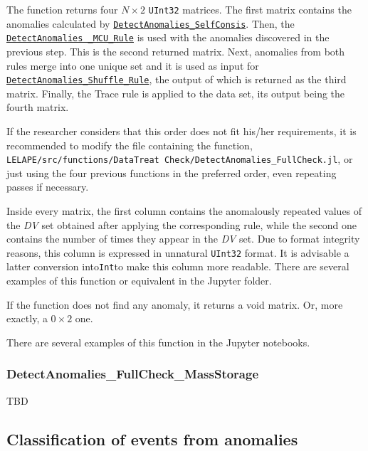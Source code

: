 \begin{itemize}
\begin{itemize}
 	\end{itemize}
 	
 	The function returns four \(N\times 2\) \texttt{UInt32} matrices. The first matrix contains the anomalies calculated by \hyperref[Fun:DetectAnomaliesSelfConsis]{\texttt{DetectAnomalies\_SelfConsis}}. Then, the \hyperref[Fun:DetectAnomaliesMCURule]{\texttt{DetectAnomalies \_MCU\_Rule}} is used with the anomalies discovered in the previous step. This is the second returned matrix. Next, anomalies from both rules merge into one unique set and it is used as input for \hyperref[Fun:DetectAnomaliesShuffleRule]{\texttt{DetectAnomalies\_Shuffle\_Rule}}, the output of which is returned as the third matrix. Finally, the Trace rule is applied to the data set, its output being the fourth matrix.
 	
 	If the researcher considers that this order does not fit his/her requirements, it is recommended to modify the file containing the function, \texttt{LELAPE/src/functions/DataTreat Check/DetectAnomalies\_FullCheck.jl}, or just using the four previous functions in the preferred order, even repeating passes if necessary.
 	
 	Inside every matrix, the first column contains the anomalously repeated values of the \textit{DV} set obtained after applying the corresponding rule, while the second one contains the number of times they appear in the \textit{DV} set. Due to format integrity reasons, this column is expressed in unnatural \texttt{UInt32} format.  	
 	It is advisable a latter conversion into\texttt{Int}to make this column more readable. There are several examples of this function or equivalent in the Jupyter folder.
 	
 	If the function does not find any anomaly, it returns a void matrix.  Or, more exactly, a \(0\times 2\) one. 
 	
 	There are several examples of this function in the Jupyter notebooks.
 \end{itemize}
%
\subsubsection*{DetectAnomalies\_FullCheck\_MassStorage}\label{Fun:DetectAnomaliesFullCheck_MassStorage}
%
TBD
%
 \subsection{Classification of events from anomalies}\label{SubSec:ClassificationEventsFromAnomalies}
